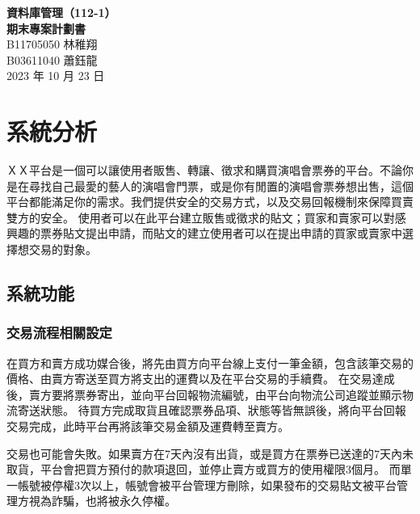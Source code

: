 \documentclass[12pt,a4paper]{article}
\begin{document}
\title{}
\author{}
\date{}

\begin{center}
\textbf{\Large 資料庫管理（112-1） \\[5pt]
期末專案計劃書} \\[10pt]
B11705050 林稚翔 \\
B03611040 蕭鈺龍 \\
2023 年 10 月 23 日
\end{center}





\section{系統分析}

ＸＸ平台是一個可以讓使用者販售、轉讓、徵求和購買演唱會票券的平台。不論你是在尋找自己最愛的藝人的演唱會門票，或是你有閒置的演唱會票券想出售，這個平台都能滿足你的需求。我們提供安全的交易方式，以及交易回報機制來保障買賣雙方的安全。
使用者可以在此平台建立販售或徵求的貼文；買家和賣家可以對感興趣的票券貼文提出申請，而貼文的建立使用者可以在提出申請的買家或賣家中選擇想交易的對象。

\subsection{系統功能}    

\subsubsection{交易流程相關設定}

在買方和賣方成功媒合後，將先由買方向平台線上支付一筆金額，包含該筆交易的價格、由賣方寄送至買方將支出的運費以及在平台交易的手續費。
在交易達成後，賣方要將票券寄出，並向平台回報物流編號，由平台向物流公司追蹤並顯示物流寄送狀態。
待買方完成取貨且確認票券品項、狀態等皆無誤後，將向平台回報交易完成，此時平台再將該筆交易金額及運費轉至賣方。

交易也可能會失敗。如果賣方在7天內沒有出貨，或是買方在票券已送達的7天內未取貨，平台會把買方預付的款項退回，並停止賣方或買方的使用權限3個月。
而單一帳號被停權3次以上，帳號會被平台管理方刪除，如果發布的交易貼文被平台管理方視為詐騙，也將被永久停權。
\end{document}
